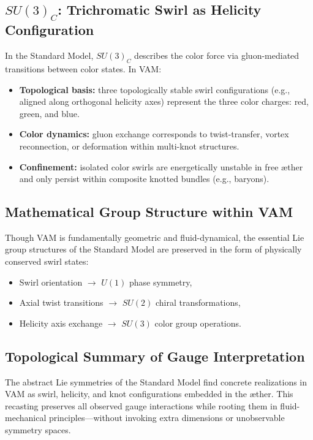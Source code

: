 \subsection{$SU(3)_C$: Trichromatic Swirl as Helicity Configuration}

In the Standard Model, $SU(3)_C$ describes the color force via gluon-mediated transitions between color states. In VAM:
\begin{itemize}
    \item \textbf{Topological basis:} three topologically stable swirl configurations (e.g., aligned along orthogonal helicity axes) represent the three color charges: red, green, and blue.
    \item \textbf{Color dynamics:} gluon exchange corresponds to twist-transfer, vortex reconnection, or deformation within multi-knot structures.
    \item \textbf{Confinement:} isolated color swirls are energetically unstable in free æther and only persist within composite knotted bundles (e.g., baryons).
\end{itemize}

\subsection{Mathematical Group Structure within VAM}

Though VAM is fundamentally geometric and fluid-dynamical, the essential Lie group structures of the Standard Model are preserved in the form of physically conserved swirl states:
\begin{itemize}
    \item Swirl orientation $\rightarrow$ $U(1)$ phase symmetry,
    \item Axial twist transitions $\rightarrow$ $SU(2)$ chiral transformations,
    \item Helicity axis exchange $\rightarrow$ $SU(3)$ color group operations.
\end{itemize}

\subsection*{Topological Summary of Gauge Interpretation}

The abstract Lie symmetries of the Standard Model find concrete realizations in VAM as swirl, helicity, and knot configurations embedded in the æther. This recasting preserves all observed gauge interactions while rooting them in fluid-mechanical principles—without invoking extra dimensions or unobservable symmetry spaces.
